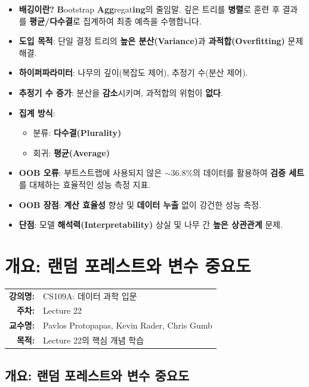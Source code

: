 \documentclass[11pt,a4paper]{book}
\makeatletter
\theoremstyle{definition}
\newcommand{\metainfo}[4]{
\begin{tcolorbox}[
    colback=lightpurple,
    colframe=darkpurple,
    boxrule=1pt,
    arc=2mm,
    left=10pt,
    right=10pt,
    top=8pt,
    bottom=8pt
]
\begin{tabular}{@{}rl@{}}
\textbf{강의명:} & #1 \\[0.3em]
\textbf{주차:} & #2 \\[0.3em]
\textbf{교수명:} & #3 \\[0.3em]
\textbf{목적:} & \begin{minipage}[t]{0.75\textwidth}#4\end{minipage}
\end{tabular}
\end{tcolorbox}
}
\makeatother
\begin{document}
\begin{summarybox}[title={배깅(Bagging) 및 OOB 핵심 정리}]
\begin{itemize}
    \item \textbf{배깅이란?} \textbf{B}ootstrap \textbf{Agg}regat\textbf{ing}의 줄임말. 깊은 트리를 \textbf{병렬}로 훈련 후 결과를 \textbf{평균/다수결}로 집계하여 최종 예측을 수행합니다.
    \item \textbf{도입 목적}: 단일 결정 트리의 \textbf{높은 분산(Variance)}과 \textbf{과적합(Overfitting)} 문제 해결.
    \item \textbf{하이퍼파라미터}: 나무의 깊이(복잡도 제어), 추정기 수(분산 제어).
    \item \textbf{추정기 수 증가}: 분산을 \textbf{감소}시키며, 과적합의 위험이 \textbf{없다}.
    \item \textbf{집계 방식}:
    \begin{itemize}
        \item 분류: \textbf{다수결(Plurality)}
        \item 회귀: \textbf{평균(Average)}
    \end{itemize}
    \item \textbf{OOB 오류}: 부트스트랩에 사용되지 않은 $\sim 36.8\%$의 데이터를 활용하여 \textbf{검증 세트}를 대체하는 효율적인 성능 측정 지표.
    \item \textbf{OOB 장점}: \textbf{계산 효율성} 향상 및 \textbf{데이터 누출} 없이 강건한 성능 측정.
    \item \textbf{단점}: 모델 \textbf{해석력(Interpretability)} 상실 및 나무 간 \textbf{높은 상관관계} 문제.
\end{itemize}
\end{summarybox}


\chapter{개요: 랜덤 포레스트와 변수 중요도}
\label{ch:lecture22}

\metainfo{CS109A: 데이터 과학 입문}{Lecture 22}{Pavlos Protopapas, Kevin Rader, Chris Gumb}{Lecture 22의 핵심 개념 학습}


\section*{개요: 랜덤 포레스트와 변수 중요도}
\end{document}
